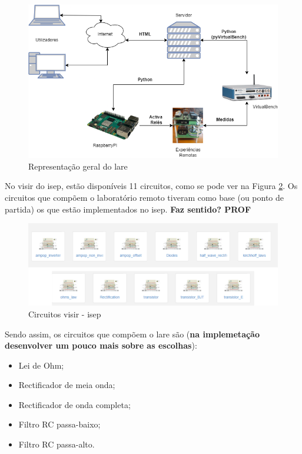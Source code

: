 \begin{figure}[hbtp]
    \centering
    \includegraphics[width=1\textwidth]{figures/arquitectura_ver2.drawio.png}
    \caption{Representação geral do \acrshort{lare}}
    \label{fig:representaçãogerallare}
\end{figure}

No \acrshort{visir} do \acrshort{isep}, estão disponíveis 11 circuitos, como se pode ver na Figura \ref{fig:circuitosvisir}. Os circuitos que compõem o \acrshort{laboratório remoto} tiveram como base (ou ponto de partida) os que estão implementados no \acrshort{isep}. \textbf{Faz sentido? PROF}

\begin{figure}[hbtp]
    \centering
    \includegraphics[width=1\textwidth]{figures/visir_ISEP.png}
    \caption{Circuitos \acrshort{visir} - \acrshort{isep}}
    \label{fig:circuitosvisir}
\end{figure}

Sendo assim, os circuitos que compõem o \acrshort{lare} são (\textbf{na implemetação desenvolver um pouco mais sobre as escolhas}):
\begin{itemize}
    \item Lei de Ohm;
    \item Rectificador de meia onda;
    \item Rectificador de onda completa;
    \item Filtro RC passa-baixo;
    \item Filtro RC passa-alto.
\end{itemize}

